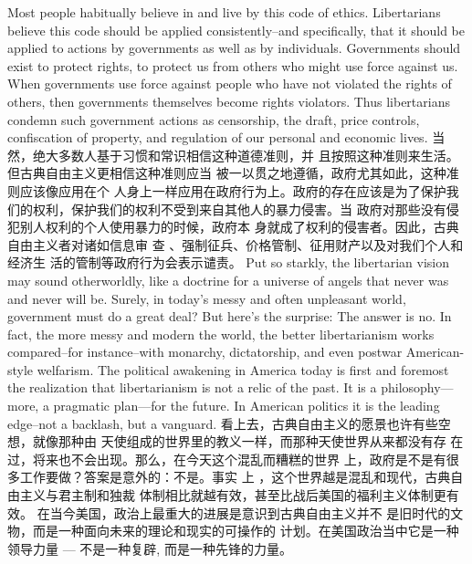 \begin{paracol}{2}
\switchcolumn*
Most people habitually believe in and live by this code of
ethics. Libertarians believe this code should be applied consistently--and specifically, that it should be applied to actions by
governments as well as by individuals. Governments should
exist to protect rights, to protect us from others who might use
force against us. When governments use force against people
who have not violated the rights of others, then governments
themselves become rights violators. Thus libertarians condemn
such government actions as censorship, the draft, price controls, confiscation of property, and regulation of our personal
and economic lives.
\switchcolumn
当然，绝大多数人基于习惯和常识相信这种道德准则，并
且按照这种准则来生活。但古典自由主义更相信这种准则应当
被一以贯之地遵循，政府尤其如此，这种准则应该像应用在个
人身上一样应用在政府行为上。政府的存在应该是为了保护我
们的权利，保护我们的权利不受到来自其他人的暴力侵害。当
政府对那些没有侵犯别人权利的个人使用暴力的时候，政府本
身就成了权利的侵害者。因此，古典自由主义者对诸如信息审
查 、强制征兵、价格管制、征用财产以及对我们个人和经济生
活的管制等政府行为会表示谴责。
\switchcolumn*
Put so starkly, the libertarian vision may sound otherworldly,
like a doctrine for a universe of angels that never was and never
will be. Surely, in today's messy and often unpleasant world,
government must do a great deal? But here's the surprise: The
answer is no. In fact, the more messy and modern the world,
the better libertarianism works compared--for instance--with
monarchy, dictatorship, and even postwar American-style welfarism. The political awakening in America today is first and
foremost the realization that libertarianism is not a relic of the
past. It is a philosophy---more, a pragmatic plan---for the future. In American politics it is the leading edge--not a backlash, but a vanguard.
\switchcolumn
看上去，古典自由主义的愿景也许有些空想，就像那种由
天使组成的世界里的教义一样，而那种天使世界从来都没有存
在过，将来也不会出现。那么，在今天这个混乱而糟糕的世界
上，政府是不是有很多工作要做？答案是意外的：不是。事实
上 ，这个世界越是混乱和现代，古典自由主义与君主制和独裁
体制相比就越有效，甚至比战后美国的福利主义体制更有效。
在当今美国，政治上最重大的进展是意识到古典自由主义并不
是旧时代的文物，而是一种面向未来的理论和现实的可操作的
计划。在美国政治当中它是一种领导力量 --- 不是一种复辟,
而是一种先锋的力量。


\end{paracol}
